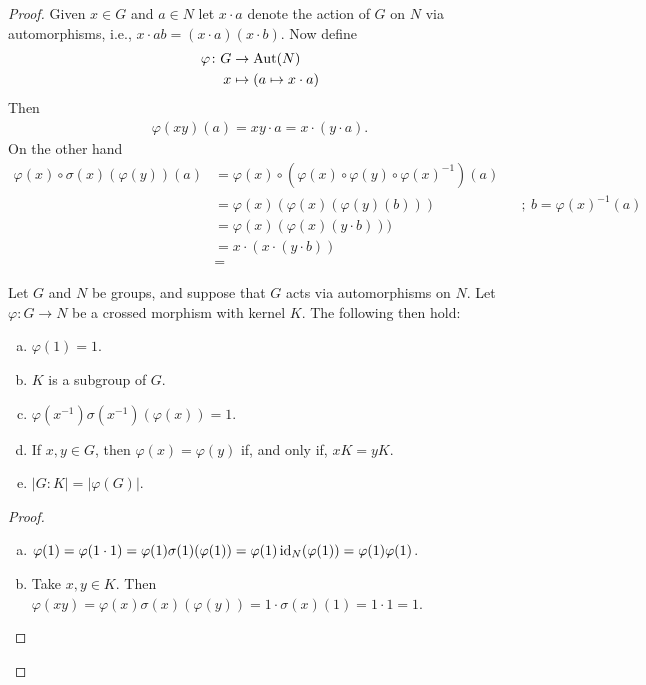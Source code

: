 \begin{proof} Given $x\in G$ and $a\in N$ let $x\cdot a$ denote the action of $G$ on $N$ via automorphisms, i.e., $x\cdot ab = (x\cdot a)(x\cdot b)$. Now define
\begin{align*}
    \varphi\colon G&\to{\rm Aut}(N)\\
    x&\mapsto (a\mapsto x\cdot a)
\end{align*}
Then
\begin{align*}
    \varphi(xy)(a) = xy\cdot a
        = x\cdot(y\cdot a).
\end{align*}
On the other hand
\begin{align*}
    \varphi(x)\circ\sigma(x)(\varphi(y))(a) &=
        \varphi(x)\circ(\varphi(x)\circ\varphi(y)\circ\varphi(x)^{-1})(a)\\
        &= \varphi(x)(\varphi(x)(\varphi(y)(b))) &&;\ b=\varphi(x)^{-1}(a)\\
        &= \varphi(x)(\varphi(x)(y\cdot b)))\\
        &= x\cdot(x\cdot(y\cdot b))\\
        &= 
\end{align*}
\fi

\begin{lem}\label{crossed-morphism-props}
    Let\/ $G$ and\/ $N$ be groups, and suppose that\/ $G$ acts via automorphisms on\/ $N$. Let\/ $\varphi\colon G\rightarrow N$ be a crossed morphism with kernel\/ $K$. The following then hold:
    \begin{enumerate}[a),font=\upshape]
    \item $\varphi(1) = 1$.
    \item $K$ is a subgroup of\/ $G$.
    \item $\varphi(x^{-1})\sigma(x^{-1})(\varphi(x))=1$.
    \item If\/ $x, y \in G$, then\/ $\varphi(x) = \varphi(y)$ if, and only if, $xK = yK$.
    \item $|G : K| = |\varphi(G)|$.
    \end{enumerate}
\end{lem}

\begin{proof}${}$
\begin{enumerate}[a),font=\upshape]
    \item $\varphi(1)=\varphi(1\cdot 1)
        =\varphi(1)\sigma(1)(\varphi(1))
        =\varphi(1)\operatorname{id}_N(\varphi(1))
        =\varphi(1)\varphi(1)$.

    \item Take $x,y\in K$. Then $\varphi(xy)
        =\varphi(x)\sigma(x)(\varphi(y))
        =1\cdot\sigma(x)(1)=1\cdot1=1$.


\end{enumerate}
\end{proof}
\end{proof}
